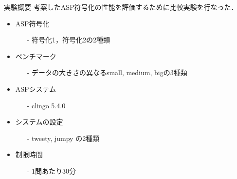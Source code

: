 \documentclass[dvipdfmx, 11pt]{beamer}
\begin{document}
\begin{frame}{実験概要}
	考案したASP符号化の性能を評価するために比較実験を行なった．
	\begin{itemize}
		\item ASP符号化
		\begin{itemize}
			\item[-] 符号化1，符号化2の2種類
		\end{itemize}
		\item ベンチマーク
		\begin{itemize}
			\item[-] データの大きさの異なるsmall, medium, bigの3種類
		\end{itemize}
		\item ASPシステム
		\begin{itemize}
			\item[-] clingo 5.4.0
		\end{itemize}
		\item システムの設定
		\begin{itemize}
			\item[-] tweety, jumpy の2種類
		\end{itemize}
		\item 制限時間
		\begin{itemize}
			\item[-] 1問あたり30分
		\end{itemize}
	\end{itemize}
\end{frame}
\end{document}
